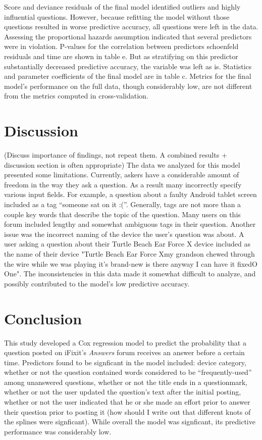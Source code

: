 \documentclass{article}
\begin{document}
Score and deviance residuals of the final model identified outliers and highly influential questions. However, because refitting the model without those questions resulted in worse predictive accuracy, all questions were left in the data. Assessing the proportional hazards assumption indicated that several predictors were in violation. P-values for the correlation between predictors schoenfeld residuals and time are shown in table e. But as stratifying on this predictor substantially decreased predictive accuracy, the variable was left as is. Statistics and parameter coefficients of the final model are in table c. Metrics for the final model's performance on the full data, though considerably low, are not different from the metrics computed in cross-validation. 

\section*{Discussion}

(Discuss importance of findings, not repeat them. A combined results + discussion section is often appropriate) 
The data we analyzed for this model presented some limitations. Currently, askers have a considerable amount of freedom in the way they ask a question. As a result many incorrectly specify various input fields. For example, a question about a faulty Android tablet screen included as a tag ``someone sat on it :(''. Generally, tags are not more than a couple key words that describe the topic of the question. Many users on this forum included lengthy and somewhat ambiguous tags in their question. Another issue was the incorrect naming of the device the user's question was about. A user asking a question about their Turtle Beach Ear Force X device included as the name of their device "Turtle Beach Ear Force Xmy grandson chewed through the wire while we was playing it's brand-new is there anyway I can have it fixedO One". The inconsistencies in this data made it somewhat difficult to analyze, and possibly contributed to the model's low predictive accuracy. 

\section*{Conclusion}

This study developed a Cox regression model to predict the probability that a question posted on iFixit's \textit{Answers} forum receives an answer before a certain time. Predictors found to be signficant in the model included: device category, whether or not the question contained words considered to be ``frequently-used'' among unanswered questions, whether or not the title ends in a questionmark, whether or not the user updated the question's text after the initial posting, whether or not the user indicated that he or she made an effort prior to answer their question prior to posting it (how should I write out that different knots of the splines were signficant). While overall the model was signficant, its predictive performance was considerably low. 
\end{document}
